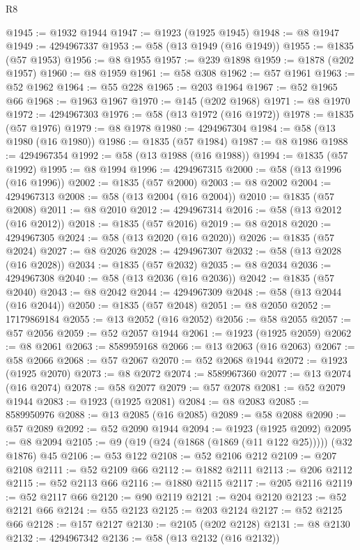 \begin{lexlean}{R8}
\begin{coremodule}
@1945 := @1932 @1944
@1947 := @1923 (@1925 @1945)
@1948 := @8 @1947
@1949 := 4294967337
@1953 := @58 (@13 @1949 (@16 @1949))
@1955 := @1835 (@57 @1953)
@1956 := @8 @1955
@1957 := @239 @1898
@1959 := @1878 (@202 @1957)
@1960 := @8 @1959
@1961 := @58 @308
@1962 := @57 @1961
@1963 := @52 @1962
@1964 := @55 @228
@1965 := @203 @1964
@1967 := @52 @1965 @66
@1968 := @1963 @1967
@1970 := @145 (@202 @1968)
@1971 := @8 @1970
@1972 := 4294967303
@1976 := @58 (@13 @1972 (@16 @1972))
@1978 := @1835 (@57 @1976)
@1979 := @8 @1978
@1980 := 4294967304
@1984 := @58 (@13 @1980 (@16 @1980))
@1986 := @1835 (@57 @1984)
@1987 := @8 @1986
@1988 := 4294967354
@1992 := @58 (@13 @1988 (@16 @1988))
@1994 := @1835 (@57 @1992)
@1995 := @8 @1994
@1996 := 4294967315
@2000 := @58 (@13 @1996 (@16 @1996))
@2002 := @1835 (@57 @2000)
@2003 := @8 @2002
@2004 := 4294967313
@2008 := @58 (@13 @2004 (@16 @2004))
@2010 := @1835 (@57 @2008)
@2011 := @8 @2010
@2012 := 4294967314
@2016 := @58 (@13 @2012 (@16 @2012))
@2018 := @1835 (@57 @2016)
@2019 := @8 @2018
@2020 := 4294967305
@2024 := @58 (@13 @2020 (@16 @2020))
@2026 := @1835 (@57 @2024)
@2027 := @8 @2026
@2028 := 4294967307
@2032 := @58 (@13 @2028 (@16 @2028))
@2034 := @1835 (@57 @2032)
@2035 := @8 @2034
@2036 := 4294967308
@2040 := @58 (@13 @2036 (@16 @2036))
@2042 := @1835 (@57 @2040)
@2043 := @8 @2042
@2044 := 4294967309
@2048 := @58 (@13 @2044 (@16 @2044))
@2050 := @1835 (@57 @2048)
@2051 := @8 @2050
@2052 := 17179869184
@2055 := @13 @2052 (@16 @2052)
@2056 := @58 @2055
@2057 := @57 @2056
@2059 := @52 @2057 @1944
@2061 := @1923 (@1925 @2059)
@2062 := @8 @2061
@2063 := 8589959168
@2066 := @13 @2063 (@16 @2063)
@2067 := @58 @2066
@2068 := @57 @2067
@2070 := @52 @2068 @1944
@2072 := @1923 (@1925 @2070)
@2073 := @8 @2072
@2074 := 8589967360
@2077 := @13 @2074 (@16 @2074)
@2078 := @58 @2077
@2079 := @57 @2078
@2081 := @52 @2079 @1944
@2083 := @1923 (@1925 @2081)
@2084 := @8 @2083
@2085 := 8589950976
@2088 := @13 @2085 (@16 @2085)
@2089 := @58 @2088
@2090 := @57 @2089
@2092 := @52 @2090 @1944
@2094 := @1923 (@1925 @2092)
@2095 := @8 @2094
@2105 := @9 (@19 (@24 (@1868 (@1869 (@11 @122 @25))))) (@32 @1876) @45
@2106 := @53 @122
@2108 := @52 @2106 @212
@2109 := @207 @2108
@2111 := @52 @2109 @66
@2112 := @1882 @2111
@2113 := @206 @2112
@2115 := @52 @2113 @66
@2116 := @1880 @2115
@2117 := @205 @2116
@2119 := @52 @2117 @66
@2120 := @90 @2119
@2121 := @204 @2120
@2123 := @52 @2121 @66
@2124 := @55 @2123
@2125 := @203 @2124
@2127 := @52 @2125 @66
@2128 := @157 @2127
@2130 := @2105 (@202 @2128)
@2131 := @8 @2130
@2132 := 4294967342
@2136 := @58 (@13 @2132 (@16 @2132))

\end{coremodule}
\end{lexlean}

